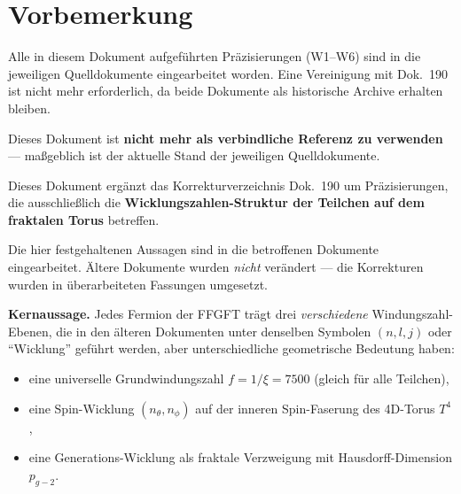 
\section*{Vorbemerkung}

\begin{tcolorbox}[colback=green!5!white, colframe=green!50!black, title={Status: Vollständig eingearbeitet — Mai 2026}]
Alle in diesem Dokument aufgeführten Präzisierungen (W1–W6) sind in
die jeweiligen Quelldokumente eingearbeitet worden. Eine Vereinigung
mit Dok.~190 ist nicht mehr erforderlich, da beide Dokumente als
historische Archive erhalten bleiben.

Dieses Dokument ist \textbf{nicht mehr als verbindliche Referenz zu
verwenden} — maßgeblich ist der aktuelle Stand der jeweiligen
Quelldokumente.
\end{tcolorbox}

\bigskip

Dieses Dokument ergänzt das Korrekturverzeichnis Dok.~190 um
Präzisierungen, die ausschließlich die \textbf{Wicklungszahlen-Struktur
der Teilchen auf dem fraktalen Torus} betreffen.

Die hier festgehaltenen Aussagen sind in die betroffenen Dokumente
eingearbeitet. Ältere Dokumente wurden \emph{nicht} verändert —
die Korrekturen wurden in überarbeiteten Fassungen umgesetzt.

\bigskip

\textbf{Kernaussage.} Jedes Fermion der FFGFT trägt drei
\emph{verschiedene} Windungszahl-Ebenen, die in den älteren
Dokumenten unter denselben Symbolen $(n,l,j)$ oder \enquote{Wicklung}
geführt werden, aber unterschiedliche geometrische Bedeutung haben:

\begin{itemize}
  \item eine universelle Grundwindungs\-zahl $f = 1/\xi = 7500$
        (gleich für alle Teilchen),
  \item eine Spin-Wicklung $(n_\theta, n_\phi)$ auf der inneren
        Spin-Faserung des 4D-Torus $T^4$,
  \item eine Generations-Wicklung als fraktale Verzweigung mit
        Hausdorff-Dimension $p_{g\!-\!2}$.
\end{itemize}

